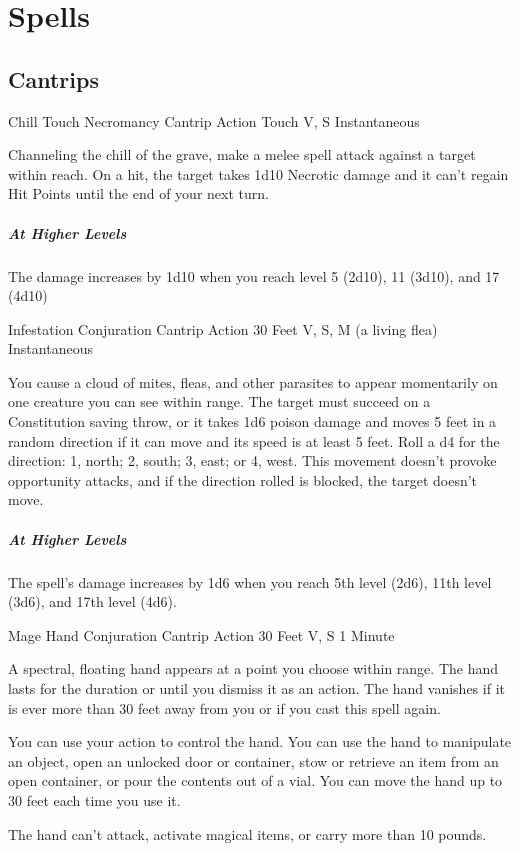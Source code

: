 \documentclass[letterpaper,openany,oneside,twocolumn]{book}
\begin{document}
\section*{Spells}
\subsection*{Cantrips}

\DndSpellHeader
  {Chill Touch}
  {Necromancy Cantrip}
  {Action}
  {Touch}
  {V, S}
  {Instantaneous}

Channeling the chill of the grave, make a melee spell attack against a target within reach. On a hit, the target takes 1d10 Necrotic damage and it can't regain Hit Points until the end of your next turn.

\subparagraph*{At Higher Levels} The damage increases by 1d10 when you reach level 5 (2d10), 11 (3d10), and 17 (4d10)

\DndSpellHeader
  {Infestation}
  {Conjuration Cantrip}
  {Action}
  {30 Feet}
  {V, S, M (a living flea)}
  {Instantaneous}

You cause a cloud of mites, fleas, and other parasites to appear momentarily on one creature you can see within range. The target must succeed on a Constitution saving throw, or it takes 1d6 poison damage and moves 5 feet in a random direction if it can move and its speed is at least 5 feet. Roll a d4 for the direction: 1, north; 2, south; 3, east; or 4, west. This movement doesn't provoke opportunity attacks, and if the direction rolled is blocked, the target doesn't move.

\subparagraph*{At Higher Levels} The spell's damage increases by 1d6 when you reach 5th level (2d6), 11th level (3d6), and 17th level (4d6).

\DndSpellHeader
  {Mage Hand}
  {Conjuration Cantrip}
  {Action}
  {30 Feet}
  {V, S}
  {1 Minute}

A spectral, floating hand appears at a point you choose within range. The hand lasts for the duration or until you dismiss it as an action. The hand vanishes if it is ever more than 30 feet away from you or if you cast this spell again.

You can use your action to control the hand. You can use the hand to manipulate an object, open an unlocked door or container, stow or retrieve an item from an open container, or pour the contents out of a vial. You can move the hand up to 30 feet each time you use it.

The hand can't attack, activate magical items, or carry more than 10 pounds.
\end{document}
